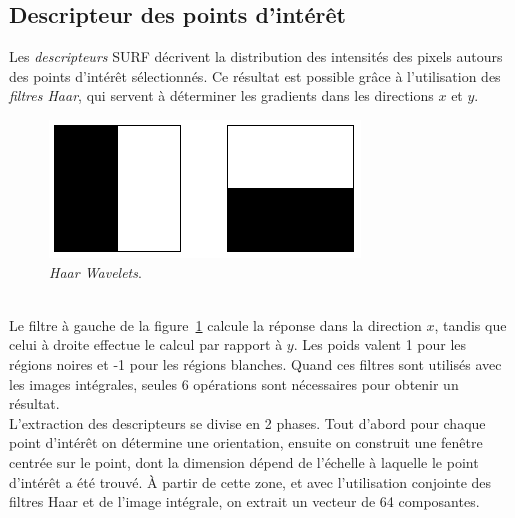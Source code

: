\documentclass[a4paper,12pt]{report}
\begin{document}
\subsection{Descripteur des points d'intérêt}
Les \textit{descripteurs} SURF décrivent la distribution des intensités des pixels autours des points d'intérêt sélectionnés. Ce résultat est possible grâce à l'utilisation des \textit{filtres Haar}, qui servent à déterminer les gradients dans les directions $x$ et $y$.
\begin{figure}[ht]
\centering
\includegraphics[scale=0.3]{figure7.png}
\caption{\textit{Haar Wavelets}.}
\label{fig7}
\end{figure}
\\Le filtre à gauche de la figure~\ref{fig7} calcule la réponse dans la direction $x$, tandis que celui à droite effectue le calcul par rapport à $y$. Les poids valent 1 pour les régions noires et -1 pour les régions blanches. Quand ces filtres sont utilisés avec les images intégrales, seules 6 opérations sont nécessaires pour obtenir un résultat. 
\\L'extraction des  descripteurs se divise en 2 phases. Tout d'abord pour chaque point d'intérêt on détermine une orientation, ensuite on construit une fenêtre centrée sur le point, dont la dimension dépend de l'échelle à laquelle le point d'intérêt a été trouvé. \`A partir de cette zone, et avec l'utilisation conjointe des filtres Haar et de l'image intégrale, on extrait un vecteur de 64 composantes.
\end{document}
